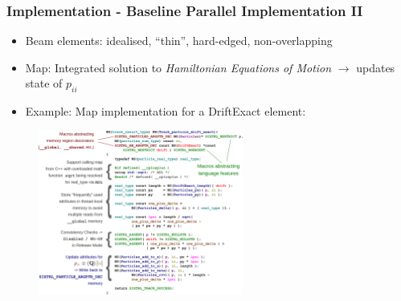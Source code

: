 \documentclass{beamer}
\begin{document}
\begin{frame}
    \frametitle{Implementation - Baseline Parallel Implementation II}
    \begin{itemize}
        \item {\color{MyDarkBlue}Beam elements:} idealised, ``thin'', hard-edged, non-overlapping
        \item {\color{MyDarkBlue}Map:} Integrated solution to \emph{Hamiltonian Equations of Motion} $\rightarrow$ updates state of $p_{ii}$
        \item {\color{MyDarkRed}Example:} Map implementation for a {\color{MyDarkBlue}DriftExact} element:
    \end{itemize}
    \begin{figure}[H]
        \centering
        \includegraphics[width=0.6\textwidth]{poster_images/fig_map_drift_exact}
    \end{figure}
\end{frame}
\end{document}
